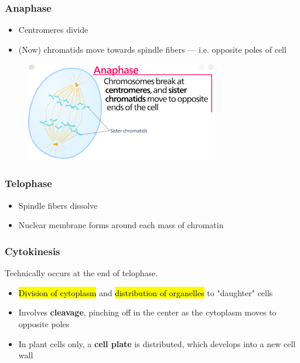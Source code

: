 \documentclass[a4paper,12pt]{article}
\begin{document}
\pagebreak

\subsubsection{Anaphase}
\begin{itemize}
    \item{Centromeres divide}
    \item{(Now) chromatids move towards spindle fibers --- i.e. opposite poles of cell}
\end{itemize}

\begin{figure}[H]
    \centering
    \includegraphics[width=0.75\textwidth]{anaphase}
\end{figure}

\subsubsection{Telophase}
\begin{itemize}
    \item{Spindle fibers dissolve}
    \item{Nuclear membrane forms around each mass of chromatin}
\end{itemize}

\subsubsection{Cytokinesis}
Technically occurs at the end of telophase.
\begin{itemize}
    \item{\hl{Division of cytoplasm} and \hl{distribution of organelles} to "daughter" cells}
    \item{Involves \textbf{cleavage}, pinching off in the center as the cytoplasm moves to opposite poles}
    \item{In plant cells only, a \textbf{cell plate} is distributed, which develops into a new cell wall}
\end{itemize}
\end{document}
